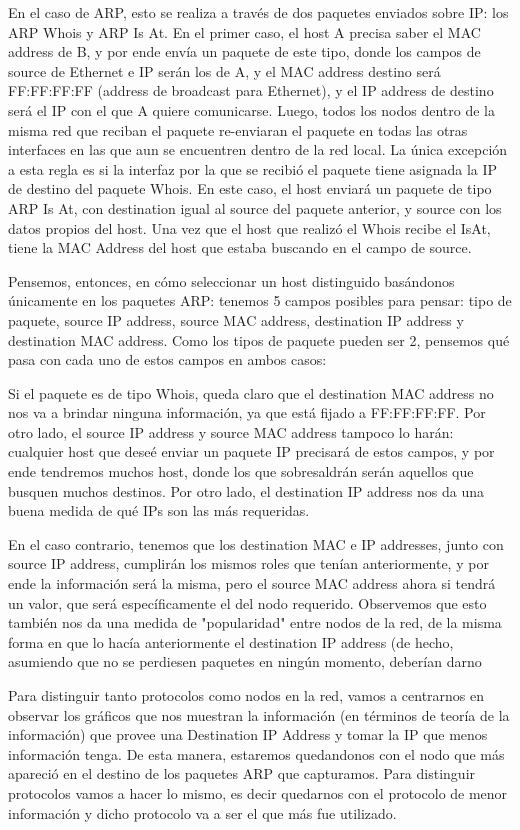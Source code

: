 \documentclass{article}
\theoremstyle{definition}
\theoremstyle{remark}
\begin{document}
En el caso de ARP, esto se realiza a través de dos paquetes enviados sobre IP: los ARP Whois y ARP Is At. En el primer caso, el host A precisa saber el MAC address de B, y por ende envía un paquete de este tipo, donde los campos de source de Ethernet e IP serán los de A, y el MAC address destino será FF:FF:FF:FF (address de broadcast para Ethernet), y el IP address de destino será el IP con el que A quiere comunicarse. Luego, todos los nodos dentro de la misma red que reciban el paquete re-enviaran el paquete en todas las otras interfaces en las que aun se encuentren dentro de la red local. La única excepción a esta regla es si la interfaz por la que se recibió el paquete tiene asignada la IP de destino del paquete Whois. En este caso, el host enviará un paquete de tipo ARP Is At, con destination igual al source del paquete anterior, y source con los datos propios del host. Una vez que el host que realizó el Whois recibe el IsAt, tiene la MAC Address del host que estaba buscando en el campo de source.

Pensemos, entonces, en cómo seleccionar un host distinguido basándonos únicamente en los paquetes ARP: tenemos 5 campos posibles para pensar: tipo de paquete, source IP address, source MAC address, destination IP address y destination MAC address. Como los tipos de paquete pueden ser 2, pensemos qué pasa con cada uno de estos campos en ambos casos:

Si el paquete es de tipo Whois, queda claro que el destination MAC address no nos va a brindar ninguna información, ya que está fijado a FF:FF:FF:FF. Por otro lado, el source IP address y source MAC address tampoco lo harán: cualquier host que deseé enviar un paquete IP precisará de estos campos, y por ende tendremos muchos host, donde los que sobresaldrán serán aquellos que busquen muchos destinos. Por otro lado, el destination IP address nos da una buena medida de qué IPs son las más requeridas.

En el caso contrario, tenemos que los destination MAC e IP addresses, junto con source IP address, cumplirán los mismos roles que tenían anteriormente, y por ende la información será la misma, pero el source MAC address ahora si tendrá un valor, que será específicamente el del nodo requerido. Observemos que esto también nos da una medida de "popularidad" entre nodos de la red, de la misma forma en que lo hacía anteriormente el destination IP address (de hecho, asumiendo que no se perdiesen paquetes en ningún momento, deberían darno

Para distinguir tanto protocolos como nodos en la red, vamos a centrarnos en observar los gráficos que nos muestran la información (en términos de teoría de la información) que provee una Destination IP Address y tomar la IP que menos información tenga. De esta manera, estaremos quedandonos con el nodo que más apareció en el destino de los paquetes ARP que capturamos. Para distinguir protocolos vamos a hacer lo mismo, es decir quedarnos con el protocolo de menor información y dicho protocolo va a ser el que más fue utilizado.
\end{document}
